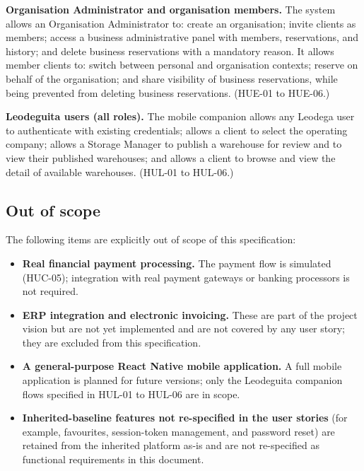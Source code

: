 \documentclass[11pt,a4paper,oneside]{report}
\begin{document}
\textbf{Organisation Administrator and organisation members.} The system allows an Organisation Administrator to: create an organisation; invite clients as members; access a business administrative panel with members, reservations, and history; and delete business reservations with a mandatory reason. It allows member clients to: switch between personal and organisation contexts; reserve on behalf of the organisation; and share visibility of business reservations, while being prevented from deleting business reservations. (HUE-01 to HUE-06.)

\textbf{Leodeguita users (all roles).} The mobile companion allows any Leodega user to authenticate with existing credentials; allows a client to select the operating company; allows a Storage Manager to publish a warehouse for review and to view their published warehouses; and allows a client to browse and view the detail of available warehouses. (HUL-01 to HUL-06.)

\subsection*{Out of scope}

The following items are explicitly out of scope of this specification:

\begin{itemize}
    \item \textbf{Real financial payment processing.} The payment flow is simulated (HUC-05); integration with real payment gateways or banking processors is not required.
    \item \textbf{ERP integration and electronic invoicing.} These are part of the project vision but are not yet implemented and are not covered by any user story; they are excluded from this specification.
    \item \textbf{A general-purpose React Native mobile application.} A full mobile application is planned for future versions; only the Leodeguita companion flows specified in HUL-01 to HUL-06 are in scope.
    \item \textbf{Inherited-baseline features not re-specified in the user stories} (for example, favourites, session-token management, and password reset) are retained from the inherited platform as-is and are not re-specified as functional requirements in this document.
\end{itemize}
\end{document}
